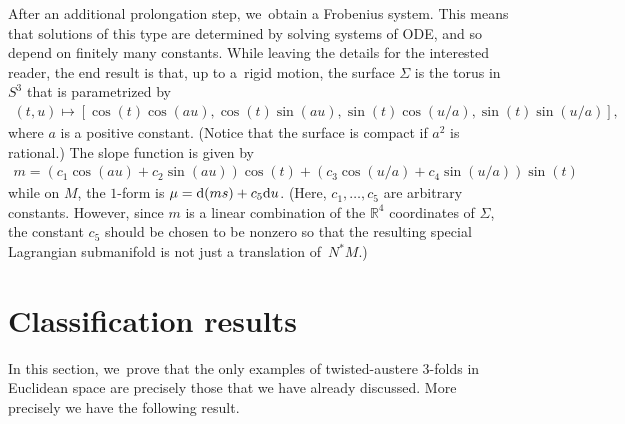 \documentclass[pdftex]{sigma}
\def\R{\mathbb{R}}
\numberwithin{equation}{section}
\begin{document}
After an additional prolongation step, we~obtain a Frobenius system. This means that solutions of this type are determined by solving systems of ODE, and so depend on finitely many constants. While leaving the details for the interested reader, the end result is that, up to a~rigid motion, the surface $\Sigma$ is the torus in $S^3$ that is parametrized by
\begin{gather*}
(t,u) \mapsto [\cos(t) \cos(au), \cos(t)\sin(au), \sin(t) \cos(u/a), \sin(t)\sin(u/a)],
\end{gather*}
where $a$ is a positive constant. (Notice that the surface is compact if $a^2$ is rational.) The slope function is given by
\begin{gather*}
m = (c_1 \cos(au)+ c_2 \sin(au)) \cos(t) + (c_3 \cos(u/a) +c_4 \sin(u/a)) \sin(t)
\end{gather*}
while on $M$, the $1$-form is $\mu = {\rm d}(ms) + c_5 {\rm d}u$. (Here, $c_1, \dots, c_5$ are arbitrary constants. However, since $m$ is a linear combination of the $\R^4$ coordinates of $\Sigma$, the constant $c_5$ should be chosen to be nonzero so that the resulting special Lagrangian submanifold is not just a translation of~$N^* M$.)

\section{Classification results} \label{sec:classification}

In this section, we~prove that the only examples of twisted-austere 3-folds in Euclidean space are precisely those that we have already discussed. More precisely we have the following result.
\end{document}
